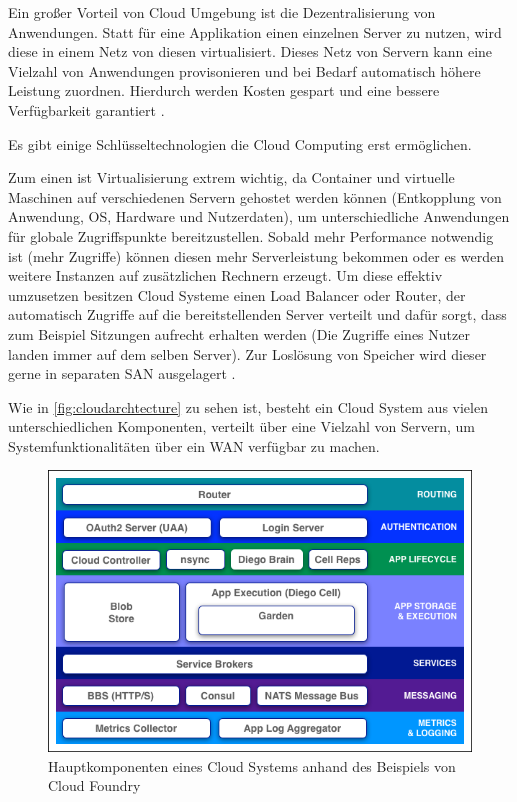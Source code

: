 Ein großer Vorteil von Cloud Umgebung ist die Dezentralisierung von Anwendungen. Statt für eine Applikation einen einzelnen Server zu nutzen, wird diese in einem Netz von diesen virtualisiert. Dieses Netz von Servern kann eine Vielzahl von Anwendungen provisonieren und bei Bedarf automatisch höhere Leistung zuordnen. Hierdurch werden Kosten gespart und eine bessere Verfügbarkeit garantiert \parencite[S. 7]{furth.2010}.

Es gibt einige Schlüsseltechnologien die Cloud Computing erst ermöglichen. 

Zum einen ist Virtualisierung extrem wichtig, da Container und virtuelle Maschinen auf verschiedenen Servern gehostet werden können (Entkopplung von Anwendung, OS, Hardware und Nutzerdaten), um unterschiedliche Anwendungen für globale Zugriffspunkte bereitzustellen. 
Sobald mehr Performance notwendig ist (mehr Zugriffe) können diesen mehr Serverleistung bekommen oder es werden weitere Instanzen auf zusätzlichen Rechnern erzeugt.
Um diese effektiv umzusetzen besitzen Cloud Systeme einen Load Balancer oder Router, der automatisch Zugriffe auf die bereitstellenden Server verteilt und dafür sorgt, dass zum Beispiel Sitzungen aufrecht erhalten werden (Die Zugriffe eines Nutzer landen immer auf dem selben Server).
Zur Loslösung von Speicher wird dieser gerne in separaten \acs{SAN} ausgelagert \parencite[S. 22]{rafaels.2015}.

Wie in \autoref{fig:cloudarchtecture} zu sehen ist, besteht ein Cloud System aus vielen unterschiedlichen Komponenten, verteilt über eine Vielzahl von Servern, um Systemfunktionalitäten über ein \ac{WAN} verfügbar zu machen.   

\begin{figure}[hbt]
	\centering
	\includegraphics[scale=0.75]{images/cloud-architecture}
	\caption{Hauptkomponenten eines Cloud Systems anhand des Beispiels von Cloud Foundry  \parencite{cloudfoundry.2017}}
	\label{fig:cloudarchtecture}
\end{figure}

